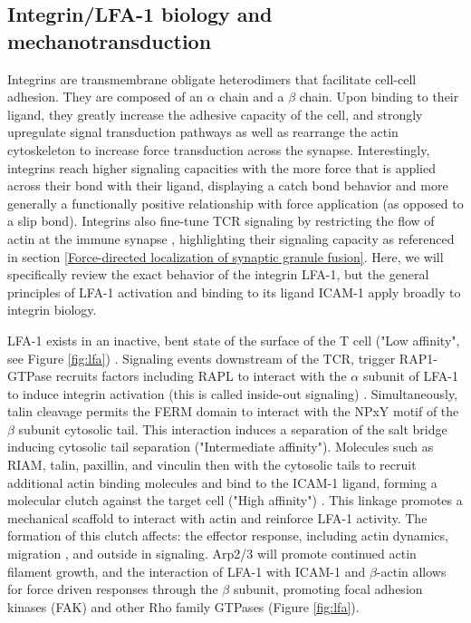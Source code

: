 \subsection{Integrin/LFA-1 biology and mechanotransduction}
\label{Integrin biology and mechanotransduction}
Integrins are transmembrane obligate heterodimers that facilitate cell-cell adhesion. They are composed of an $\alpha$ chain and a $\beta$ chain. Upon  binding to their ligand, they greatly increase the adhesive capacity of the cell, and strongly upregulate signal transduction pathways as well as rearrange the actin cytoskeleton to increase force transduction across the synapse. Interestingly, integrins reach higher signaling capacities with the more force that is applied across their bond with their ligand, displaying a catch bond behavior \cite{Chen2010} and more generally a functionally positive relationship with force application (as opposed to a slip bond). Integrins also fine-tune TCR signaling by restricting the flow of actin at the immune synapse \cite{Jankowska2018}, highlighting their signaling capacity as referenced in section \ref{Force-directed localization of synaptic granule fusion}. Here, we will specifically review the exact behavior of the integrin LFA-1, but the general principles of LFA-1 activation and binding to its ligand ICAM-1 apply broadly to integrin biology.

LFA-1 exists in an inactive, bent state of the surface of the T cell ("Low affinity", see Figure \ref{fig:lfa}) \cite{Comrie2015_2}. Signaling events downstream of the TCR, trigger RAP1-GTPase recruits factors including RAPL to interact with the $\alpha$ subunit of LFA-1 to induce integrin activation (this is called inside-out signaling) \cite{Walling2018}. Simultaneously, talin cleavage permits the FERM domain to interact with the NPxY motif of the $\beta$ subunit cytosolic tail. This interaction induces a separation of the salt bridge inducing cytosolic tail separation ("Intermediate affinity"). Molecules such as RIAM, talin, paxillin, and vinculin then with the cytosolic tails to recruit additional actin binding molecules and bind to the ICAM-1 ligand, forming a molecular clutch against the target cell ("High affinity") \cite{Comrie2015_2}. This linkage promotes a mechanical scaffold to interact with actin and reinforce LFA-1 activity. The formation of this clutch affects: the effector response, including actin dynamics, migration \cite{Nordenfelt2016}, and outside in signaling. Arp2/3 will promote continued actin filament growth, and the interaction of LFA-1 with ICAM-1 and $\beta$-actin allows for force driven responses through the $\beta$ subunit, promoting focal adhesion kinases (FAK) and other Rho family GTPases (Figure \ref{fig:lfa}).

